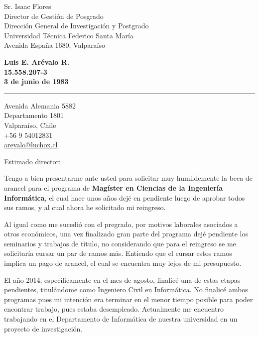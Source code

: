 \documentclass[12pt]{letter} %
\begin{document}
\signature{Luis E. Arévalo R.}           %
\longindentation=0pt                       %
\let\raggedleft\raggedright                %
 
 
\begin{letter}{Sr. Isaac Flores \\
Director de Gestión de Posgrado \\
Dirección General de Investigación y Postgrado \\
Universidad Técnica Federico Santa María \\
Avenida España 1680, Valparaíso}

\begin{center}
{\large\bf Luis E. Arévalo R. \\ 15.558.207-3 \\ 3 de junio de 1983} 
\end{center}
\medskip\hrule height 1pt
\begin{center}
{Avenida Alemania 5882 \\ Departamento 1801 \\ Valparaíso, Chile \\
  +56 9 54012831 \\ \url{arevalo@luchox.cl}}
\end{center} \vfill %
 
 
\opening{Estimado director:} 
 
\noindent Tengo a bien presentarme ante usted para solicitar muy humildemente la beca de arancel para el programa de \textbf{Magíster en Ciencias de la Ingeniería Informática}, el cual hace unos años dejé en pendiente luego de aprobar todos sus ramos, y al cual ahora he solicitado mi reingreso.

\noindent Al igual como me sucedió con el pregrado, por motivos laborales asociados a otros económicos, una vez finalizado gran parte del programa dejé pendiente los seminarios y trabajos de título, no considerando que para el reingreso se me solicitaría cursar un par de ramos más. Entiendo que el cursar estos ramos implica un pago de arancel, el cual se encuentra muy lejos de mi presupuesto.

\noindent El año 2014, específicamente en el mes de agosto, finalicé una de estas etapas pendientes, titulándome como Ingeniero Civil en Informática. No finalicé ambos programas pues mi intención era terminar en el menor tiempo posible para poder encontrar trabajo, pues estaba desempleado. Actualmente me encuentro trabajando en el Departamento de Informática de nuestra universidad en un proyecto de investigación.


\end{letter}
\end{document}
